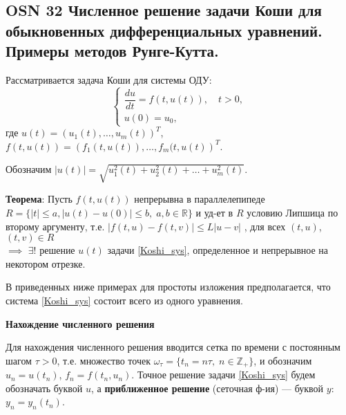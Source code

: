 \subsection{OSN 32 Численное решение задачи Коши для обыкновенных дифференциальных уравнений. Примеры методов Рунге-Кутта.}


Рассматривается задача Коши для системы ОДУ:
\begin{equation}
%
    \label{Koshi_sys}
    \begin{cases}
        \dfrac{du}{dt} = f(t, u(t)), \quad t > 0, \\
        u(0) = u_0,
    \end{cases}
\end{equation}
%
где
$u(t)=\left(u_1(t), \dots, u_m(t)\right)^T$, $f(t, u(t)) = \left(f_1(t, u(t)), \dots, f_m(t,u(t)\right)^T$.

Обозначим $ | u(t) | = \sqrt{u_1^2(t) + u_2^2(t) + \ldots + u_m^2(t)}$.

\textbf{Теорема}: Пусть $f(t, u(t))$ непрерывна в параллелепипеде 
$ R = \{|t| \leqslant a, | u(t)-u(0)| \leqslant b,\; a, b\in\mathbb{R}\} $ 
и уд-ет в $R$ условию Липшица по второму аргументу, т.е. 
$|f(t, u) - f(t, v)| \leqslant L|u - v|$
, для всех $(t, u)$, $(t, v) \in R$\\ 
$\implies $
$\exists!$ решение $u(t)$ задачи \eqref{Koshi_sys}, определенное и непрерывное на некотором отрезке.



В приведенных ниже примерах для простоты изложения предполагается, что
система \eqref{Koshi_sys} состоит всего из одного уравнения.

\centerline{\textbf{Нахождение численного решения}}


Для нахождения численного решения вводится сетка по времени с постоянным шагом $\tau>0$, т.е. множество точек
$\omega_\tau = \{t_n = n\tau,\;n \in \mathbb{Z}_+\}$, и обозначим
$u_n = u(t_n)$, $f_n = f(t_n, u_n)$.
Точное решение задачи \eqref{Koshi_sys} будем обозначать буквой $u$,
а \textbf{приближенное решение} (сеточная ф-ия) --- буквой $y$: $y_n = y_n(t_n)$.

